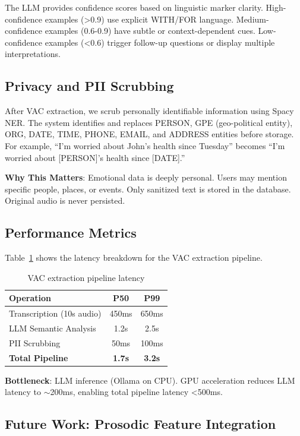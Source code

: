 \documentclass[10pt,twocolumn]{article}
\begin{document}
The LLM provides confidence scores based on linguistic marker clarity. High-confidence examples (>0.9) use explicit WITH/FOR language. Medium-confidence examples (0.6-0.9) have subtle or context-dependent cues. Low-confidence examples (<0.6) trigger follow-up questions or display multiple interpretations.

\subsection{Privacy and PII Scrubbing}

After VAC extraction, we scrub personally identifiable information using Spacy NER. The system identifies and replaces PERSON, GPE (geo-political entity), ORG, DATE, TIME, PHONE, EMAIL, and ADDRESS entities before storage. For example, ``I'm worried about John's health since Tuesday'' becomes ``I'm worried about [PERSON]'s health since [DATE].''

\textbf{Why This Matters}: Emotional data is deeply personal. Users may mention specific people, places, or events. Only sanitized text is stored in the database. Original audio is never persisted.

\subsection{Performance Metrics}

Table~\ref{tab:extraction-latency} shows the latency breakdown for the VAC extraction pipeline.

\begin{table}[h]
\centering
\caption{VAC extraction pipeline latency}
\label{tab:extraction-latency}
\begin{tabular}{lcc}
\toprule
\textbf{Operation} & \textbf{P50} & \textbf{P99} \\
\midrule
Transcription (10s audio) & 450ms & 650ms \\
LLM Semantic Analysis & 1.2s & 2.5s \\
PII Scrubbing & 50ms & 100ms \\
\textbf{Total Pipeline} & \textbf{1.7s} & \textbf{3.2s} \\
\bottomrule
\end{tabular}
\end{table}

\textbf{Bottleneck}: LLM inference (Ollama on CPU). GPU acceleration reduces LLM latency to $\sim$200ms, enabling total pipeline latency <500ms.

\subsection{Future Work: Prosodic Feature Integration}
\end{document}
